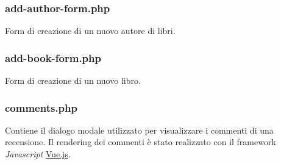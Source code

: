 \documentclass[italian]{article}
\begin{document}
\subsubsection{add-author-form.php}
Form di creazione di un nuovo autore di libri.


\subsubsection{add-book-form.php}
Form di creazione di un nuovo libro.


\subsubsection{comments.php}
Contiene il dialogo modale utilizzato per visualizzare i commenti di una recensione. Il rendering dei commenti è stato realizzato con il framework \textit{Javascript} \href{https://vuejs.org/}{Vue.js}.

\end{document}
